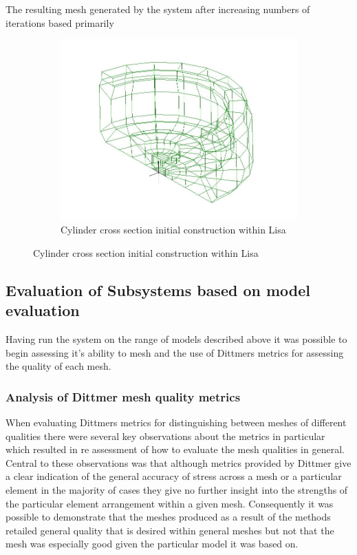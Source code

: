 The resulting mesh generated by the system after increasing numbers of iterations based primarily

\begin{figure}
\centering
\begin{subfigure}{.5\textwidth}
  \centering
  \includegraphics[width=0.9\linewidth]{../Graphics/DolsakCylinderWithinLisa.jpeg}
  \caption{Cylinder cross section initial construction within Lisa \cite{DolsakPaper91}}
  \label{fig:sub1}
\end{subfigure}%
\label{fig:test}
\end{figure}




\newpage
\subsection{Evaluation of Subsystems based on model evaluation}
Having run the system on the range of models described above it was possible to begin assessing it's ability to mesh and the use of Dittmers metrics for assessing 
the quality of each mesh.

\subsubsection{Analysis of Dittmer mesh quality metrics}
When evaluating Dittmers metrics for distinguishing between meshes of different qualities there were several key observations about the metrics in particular which resulted in re assessment of how to evaluate the mesh qualities in general.
Central to these observations was that although metrics provided by Dittmer give a clear indication of the general accuracy of stress across a mesh or a particular element in the majority of cases they give no further insight into the strengths of the particular element arrangement within a given mesh. Consequently it was possible to demonstrate that the meshes produced as a result of the methods retailed general quality that is desired within general meshes but not that the mesh was especially good given the particular model it was based on. \\



